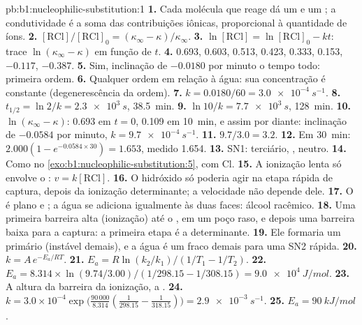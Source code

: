\begin{solution}{pb:b1:nucleophilic-substitution:1}
\textbf{1.} Cada molécula que reage dá um  e um ; a
condutividade é a soma das contribuições iônicas, proporcional à
quantidade de íons.
\textbf{2.} $[\mathrm{RCl}]/[\mathrm{RCl}]_0 = (\kappa_\infty -
\kappa)/\kappa_\infty$.
\textbf{3.} $\ln[\mathrm{RCl}] = \ln[\mathrm{RCl}]_0 - kt$: trace
$\ln(\kappa_\infty - \kappa)$ em função de $t$.
\textbf{4.} 0.693, 0.603, 0.513, 0.423, 0.333, 0.153, $-0.117$, $-0.387$.
\textbf{5.} Sim, inclinação de $-0.0180$ por minuto o tempo todo:
primeira ordem.
\textbf{6.} Qualquer ordem em relação à água: sua concentração é
constante (degenerescência da ordem).
\textbf{7.} $k = 0.0180/60 = \qty{3.0e-4}{s^{-1}}$.
\textbf{8.} $t_{1/2} = \ln 2/k = \qty{2.3e3}{s}$, \qty{38.5}{min}.
\textbf{9.} $\ln 10/k = \qty{7.7e3}{s}$, \qty{128}{min}.
\textbf{10.} $\ln(\kappa_\infty - \kappa)$: 0.693 em $t = 0$, 0.109 em
\qty{10}{min}, e assim por diante: inclinação de $-0.0584$ por minuto,
$k = \qty{9.7e-4}{s^{-1}}$.
\textbf{11.} $9.7/3.0 = 3.2$.
\textbf{12.} Em \qty{30}{min}: $2.000(1 - e^{-0.0584 \times 30}) = 1.653$,
medido 1.654.
\textbf{13.} SN1:  terciário, , 
neutro.
\textbf{14.} Como no \cref{exo:b1:nucleophilic-substitution:5}, com Cl.
\textbf{15.} A ionização lenta só envolve o : $v =
k[\mathrm{RCl}]$.
\textbf{16.} O hidróxido só poderia agir na etapa rápida de captura,
depois da ionização determinante; a velocidade não depende dele.
\textbf{17.} O  é plano e ; a água se adiciona
igualmente às duas faces: álcool racêmico.
\textbf{18.} Uma primeira barreira alta (ionização) até o ,
em um poço raso, e depois uma barreira baixa para a captura: a primeira
etapa é a determinante.
\textbf{19.} Ele formaria um  primário (instável demais), e a
água é um  fraco demais para uma SN2 rápida.
\textbf{20.} $k = A\,e^{-E_a/RT}$.
\textbf{21.} $E_a = R\ln(k_2/k_1)/(1/T_1 - 1/T_2)$.
\textbf{22.} $E_a = 8.314 \times \ln(9.74/3.00)/(1/298.15 - 1/308.15) =
\qty{9.0e4}{J/mol}$.
\textbf{23.} A altura da barreira da ionização, a .
\textbf{24.} $k = 3.0 \times 10^{-4} \exp\bigl(\frac{90\,000}{8.314}
(\frac{1}{298.15} - \frac{1}{318.15})\bigr) = \qty{2.9e-3}{s^{-1}}$.
\textbf{25.} \textbf{$E_a = \qty{90}{kJ/mol}$}.
\end{solution}

